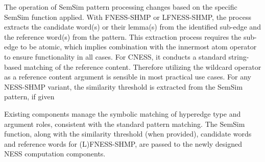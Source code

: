 \documentclass[11pt]{scrreprt}
\begin{document}
The operation of SemSim pattern processing changes based on the specific SemSim function applied. With FNESS-SHMP or LFNESS-SHMP, the process extracts the candidate word(s) or their lemma(s) from the identified sub-edge and the reference word(s) from the pattern. This extraction process requires the sub-edge to be atomic, which implies combination with the innermost atom operator to ensure functionality in all cases. For CNESS, it conducts a standard string-based matching of the reference content. Therefore  utilizing the wildcard operator as a reference content argument is sensible in most practical use cases. For any NESS-SHMP variant, the similarity threshold is extracted from the SemSim pattern, if given

Existing components manage the symbolic matching of hyperedge type and argument roles, consistent with the standard pattern matching. The SemSim function, along with the similarity threshold (when provided), candidate words and reference words for (L)FNESS-SHMP, are passed to the newly designed NESS computation components.
\end{document}
